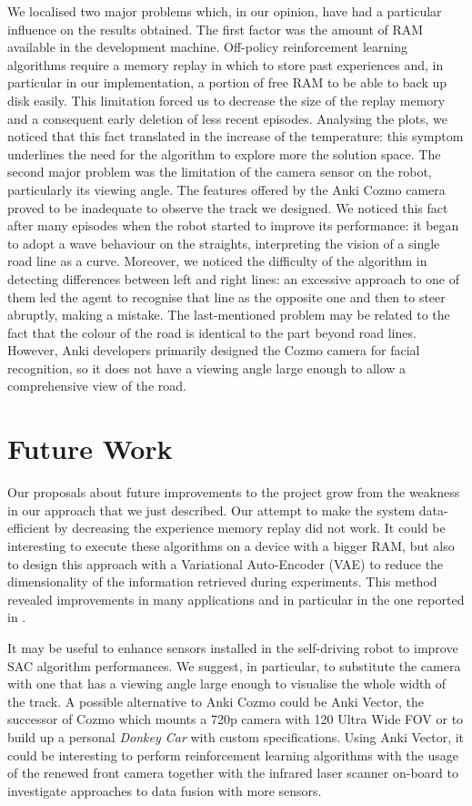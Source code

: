 We localised two major problems which, in our opinion, have had a particular influence on the results obtained.
The first factor was the amount of RAM available in the development machine.
Off-policy reinforcement learning algorithms require a memory replay in which to store past experiences and, in particular in our implementation, a portion of free RAM to be able to back up disk easily. This limitation forced us to decrease the size of the replay memory and a consequent early deletion of less recent episodes. Analysing the plots, we noticed that this fact translated in the increase of the temperature: this symptom underlines the need for the algorithm to explore more the solution space.
The second major problem was the limitation of the camera sensor on the robot, particularly its viewing angle. The features offered by the Anki Cozmo camera proved to be inadequate to observe the track we designed.
We noticed this fact after many episodes when the robot started to improve its performance: it began to adopt a wave behaviour on the straights, interpreting the vision of a single road line as a curve.
Moreover, we noticed the difficulty of the algorithm in detecting differences between left and right lines: an excessive approach to one of them led the agent to recognise that line as the opposite one and then to steer abruptly, making a mistake.
The last-mentioned problem may be related to the fact that the colour of the road is identical to the part beyond road lines.
However, Anki developers primarily designed the Cozmo camera for facial recognition, so it does not have a viewing angle large enough to allow a comprehensive view of the road.


\section{Future Work}

Our proposals about future improvements to the project grow from the weakness in our approach that we just described.
Our attempt to make the system data-efficient by decreasing the experience memory replay did not work. It could be interesting to execute these algorithms on a device with a bigger RAM, but also to design this approach with a Variational Auto-Encoder (VAE) \cite{kingma2013auto} to reduce the dimensionality of the information retrieved during experiments.
This method revealed improvements in many applications and in particular in the one reported in \cite{kendall2018learning,kendall2019learning}.

It may be useful to enhance sensors installed in the self-driving robot to improve SAC algorithm performances.
We suggest, in particular, to substitute the camera with one that has a viewing angle large enough to visualise the whole width of the track.
A possible alternative to Anki Cozmo could be Anki Vector, the successor of Cozmo which mounts a 720p camera with 120 Ultra Wide FOV or to build up a personal \textit{Donkey Car} with custom specifications.
Using Anki Vector, it could be interesting to perform reinforcement learning algorithms with the usage of the renewed front camera together with the infrared laser scanner on-board to investigate approaches to data fusion with more sensors.

